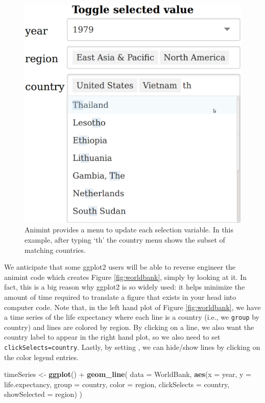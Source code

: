 \documentclass[12pt,]{isuthesis}
\newenvironment{Shaded}{\begin{snugshade}}{\end{snugshade}}
\newcommand{\KeywordTok}[1]{\textcolor[rgb]{0.13,0.29,0.53}{\textbf{{#1}}}}
\newcommand{\DataTypeTok}[1]{\textcolor[rgb]{0.13,0.29,0.53}{{#1}}}
\newcommand{\StringTok}[1]{\textcolor[rgb]{0.31,0.60,0.02}{{#1}}}
\newcommand{\NormalTok}[1]{{#1}}
\begin{document}
\begin{figure}[htbp]
\centering
\includegraphics{images/Screenshot-toggle-selected-value}
\caption{\label{fig:widgets}Animint provides a menu to update each selection
variable. In this example, after typing `th' the country menu shows the
subset of matching countries.}
\end{figure}

We anticipate that some ggplot2 users will be able to reverse engineer
the animint code which creates Figure \ref{fig:worldbank}, simply by
looking at it. In fact, this is a big reason why ggplot2 is so widely
used: it helps minimize the amount of time required to translate a
figure that exists in your head into computer code. Note that, in the
left hand plot of Figure \ref{fig:worldbank}, we have a time series of
the life expectancy where each line is a country (i.e., we
\texttt{group} by country) and lines are colored by region. By clicking
on a line, we also want the country label to appear in the right hand
plot, so we also need to set \texttt{clickSelects=country}. Lastly, by
setting , we can hide/show lines by clicking
on the color legend entries.

\begin{Shaded}
\begin{Highlighting}[]
\NormalTok{timeSeries <-}\StringTok{ }\KeywordTok{ggplot}\NormalTok{() +}\StringTok{ }\KeywordTok{geom_line}\NormalTok{(}
  \DataTypeTok{data =} \NormalTok{WorldBank,}
  \KeywordTok{aes}\NormalTok{(}\DataTypeTok{x =} \NormalTok{year, }\DataTypeTok{y =} \NormalTok{life.expectancy,}
      \DataTypeTok{group =} \NormalTok{country, }\DataTypeTok{color =} \NormalTok{region,}
      \DataTypeTok{clickSelects =} \NormalTok{country, }
      \DataTypeTok{showSelected =} \NormalTok{region)}
\NormalTok{)}
\end{Highlighting}
\end{Shaded}
\end{document}
